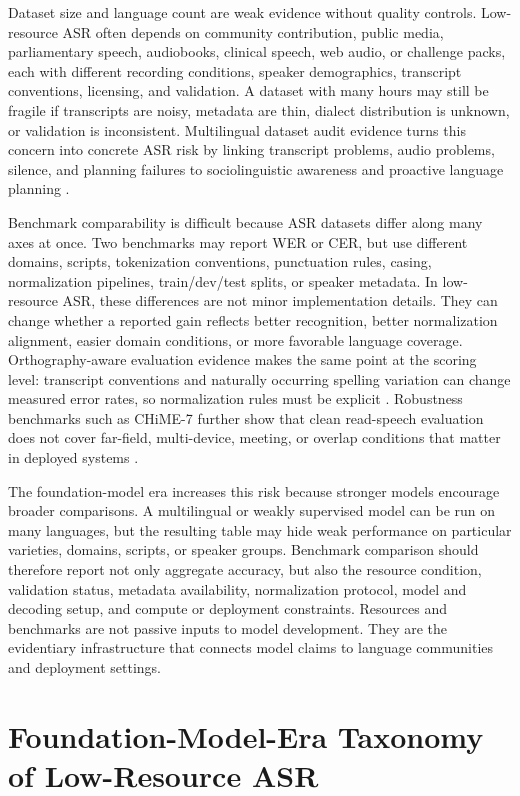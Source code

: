 \documentclass[pdflatex,sn-basic]{sn-jnl}
\theoremstyle{thmstyleone}
\theoremstyle{thmstyletwo}
\theoremstyle{thmstylethree}
\begin{document}
Dataset size and language count are weak evidence without quality controls. Low-resource ASR often depends on community contribution, public media, parliamentary speech, audiobooks, clinical speech, web audio, or challenge packs, each with different recording conditions, speaker demographics, transcript conventions, licensing, and validation. A dataset with many hours may still be fragile if transcripts are noisy, metadata are thin, dialect distribution is unknown, or validation is inconsistent. Multilingual dataset audit evidence turns this concern into concrete ASR risk by linking transcript problems, audio problems, silence, and planning failures to sociolinguistic awareness and proactive language planning \citep{lau2025_data_quality_multilingual_speech}.

Benchmark comparability is difficult because ASR datasets differ along many axes at once. Two benchmarks may report WER or CER, but use different domains, scripts, tokenization conventions, punctuation rules, casing, normalization pipelines, train/dev/test splits, or speaker metadata. In low-resource ASR, these differences are not minor implementation details. They can change whether a reported gain reflects better recognition, better normalization alignment, easier domain conditions, or more favorable language coverage. Orthography-aware evaluation evidence makes the same point at the scoring level: transcript conventions and naturally occurring spelling variation can change measured error rates, so normalization rules must be explicit \citep{karita2023lenient}. Robustness benchmarks such as CHiME-7 further show that clean read-speech evaluation does not cover far-field, multi-device, meeting, or overlap conditions that matter in deployed systems \citep{cornell2023chime7}.

The foundation-model era increases this risk because stronger models encourage broader comparisons. A multilingual or weakly supervised model can be run on many languages, but the resulting table may hide weak performance on particular varieties, domains, scripts, or speaker groups. Benchmark comparison should therefore report not only aggregate accuracy, but also the resource condition, validation status, metadata availability, normalization protocol, model and decoding setup, and compute or deployment constraints. Resources and benchmarks are not passive inputs to model development. They are the evidentiary infrastructure that connects model claims to language communities and deployment settings.

\section{Foundation-Model-Era Taxonomy of Low-Resource ASR}
\end{document}
